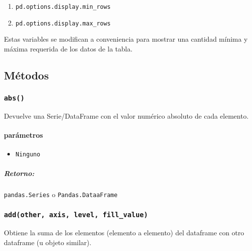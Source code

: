         \begin{enumerate}
            \item\texttt{pd.options.display.min\_rows}
            \item\texttt{pd.options.display.max\_rows}
        \end{enumerate}
        Estas variables se modifican a conveniencia para mostrar una cantidad mínima y máxima requerida de los datos de la tabla.

        \subsection{Métodos}


        \subsubsection{\texttt{abs()}} Devuelve una Serie/DataFrame con el valor numérico absoluto de cada elemento.
        \paragraph{\textbf{parámetros}}
        \begin{itemize}
            \item \texttt{Ninguno}
        \end{itemize}
        \subparagraph{\textbf{Retorno:}} \texttt{pandas.Series} o \texttt{Pandas.DataaFrame}

        \subsubsection{\texttt{add(other, axis, level, fill\_value)}} Obtiene la suma de los elementos (elemento a elemento) del dataframe con otro dataframe (u objeto similar).
